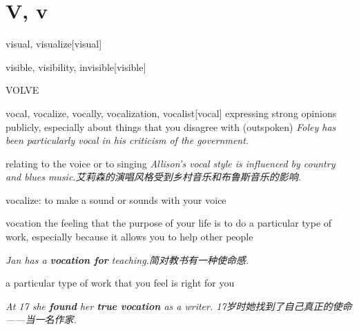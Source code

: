 \section{V, v}

\begin{DefWord}{visual, visualize}[visual]
\end{DefWord}

\begin{DefWord}{visible, visibility, invisible}[visible]
\end{DefWord}

\begin{DefWord}{VOLVE}
\end{DefWord}

\begin{DefWord}{vocal, vocalize, vocally, vocalization, vocalist}[vocal]
    expressing strong opinions publicly, especially about things that you disagree with (outspoken)
    \textit{Foley has been particularly vocal in his criticism of the government.}

    relating to the voice or to singing
    \textit{Allison's vocal style is influenced by country and blues music.艾莉森的演唱风格受到乡村音乐和布鲁斯音乐的影响. }

    vocalize: to make a sound or sounds with your voice
\end{DefWord}

\begin{DefWord}{vocation}
    the feeling that the purpose of your life is to do a particular type of work, especially because it allows you to help other people

    \textit{Jan has a \textbf{vocation for} teaching.简对教书有一种使命感. }

    a particular type of work that you feel is right for you

    \textit{At 17 she \textbf{found} her \textbf{true vocation} as a writer. 17岁时她找到了自己真正的使命——当一名作家. }
\end{DefWord}